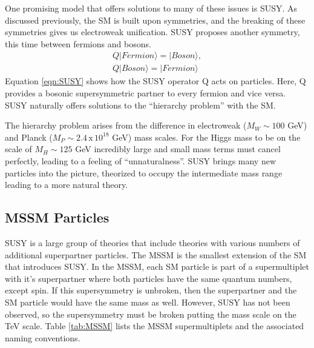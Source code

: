 	One promising model that offers solutions to many of these issues is \gls{SUSY}. As discussed previously, the \gls{SM} is built upon symmetries, and the breaking of these symmetries gives us electroweak unification. \gls{SUSY} proposes another symmetry, this time between fermions and bosons. 
	\begin{equation}\label{eqn:SUSY}
	\begin{split}
		Q | Fermion \rangle = | Boson \rangle, \\
		Q | Boson \rangle = | Fermion \rangle
	\end{split}
	\end{equation}
	Equation \ref{eqn:SUSY} shows how the \gls{SUSY} operator Q acts on particles. Here, Q provides a bosonic supersymmetric partner to every fermion and vice versa. \gls{SUSY} naturally offers solutions to the ``hierarchy problem'' with the \gls{SM}. 

	The hierarchy problem arises from the difference in electroweak ($M_W\sim100$ GeV)  and Planck ($M_P\sim2.4\, \mathrm{x} \, 10^{18}$ GeV) mass scales. For the Higgs mass to be on the scale of $M_H \sim 125$ GeV incredibly large and small mass terms must cancel perfectly, leading to a feeling of ``unnaturalness''. \gls{SUSY} brings many new particles into the picture, theorized to occupy the intermediate mass range leading to a more natural theory.

	\subsection{\acrlong{MSSM} Particles}\label{ssec:MSMM}
		\gls{SUSY} is a large group of theories that include theories with various numbers of additional superpartner particles. The \gls{MSSM} is the smallest extension of the \gls{SM} that introduces \gls{SUSY}. In the \gls{MSSM}, each \gls{SM} particle is part of a supermultiplet with it's superpartner where both particles have the same quantum numbers, except spin. If this supersymmetry is unbroken, then the superpartner and the \gls{SM} particle would have the same mass as well. However, \gls{SUSY} has not been observed, so the supersymmetry must be broken putting the mass scale on the TeV scale. Table \ref{tab:MSSM} lists the \gls{MSSM} supermultiplets and the associated naming conventions.

